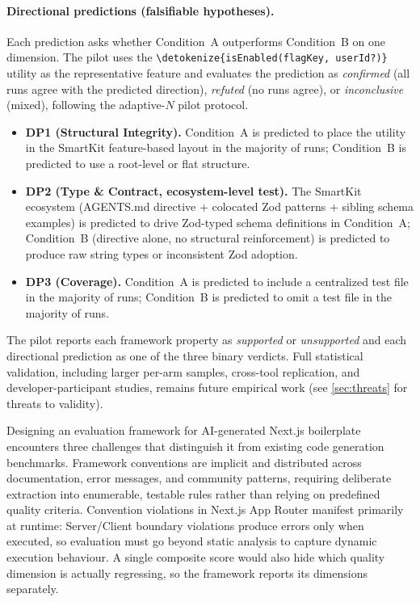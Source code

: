 \documentclass[12pt,a4paper]{report}
\newcommand{\code}[1]{\texttt{\nolinkurl{\detokenize{#1}}}}
\begin{document}
\paragraph{Directional predictions (falsifiable hypotheses).} Each
prediction asks whether Condition~A outperforms Condition~B on one
dimension. The pilot uses the \code{isEnabled(flagKey, userId?)}
utility as the representative feature and evaluates the prediction as
\emph{confirmed} (all runs agree with the predicted direction),
\emph{refuted} (no runs agree), or \emph{inconclusive} (mixed),
following the adaptive-$N$ pilot protocol.

\begin{itemize}
    \item \textbf{DP1 (Structural Integrity).} Condition~A is predicted to place the
    utility in the SmartKit feature-based layout in the majority of runs;
    Condition~B is predicted to use a root-level or flat structure.
    \item \textbf{DP2 (Type \& Contract, ecosystem-level test).} The SmartKit ecosystem (AGENTS.md directive + colocated Zod patterns + sibling schema examples) is predicted to drive Zod-typed schema definitions in Condition~A; Condition~B (directive alone, no structural reinforcement) is predicted to produce raw string types or inconsistent Zod adoption.
    \item \textbf{DP3 (Coverage).} Condition~A is predicted to include a
    centralized test file in the majority of runs;
    Condition~B is predicted to omit a test file in the majority of runs.
\end{itemize}

The pilot reports each framework property as \emph{supported} or
\emph{unsupported} and each directional prediction as one of the three
binary verdicts. Full statistical validation, including larger
per-arm samples, cross-tool replication, and developer-participant
studies, remains future empirical work (see \autoref{sec:threats}
for threats to validity).

Designing an evaluation framework for AI-generated Next.js boilerplate encounters three challenges that distinguish it from existing code generation benchmarks. Framework conventions are implicit and distributed across documentation, error messages, and community patterns, requiring deliberate extraction into enumerable, testable rules rather than relying on predefined quality criteria. Convention violations in Next.js App Router manifest primarily at runtime: Server/Client boundary violations produce errors only when executed, so evaluation must go beyond static analysis to capture dynamic execution behaviour. A single composite score would also hide which quality dimension is actually regressing, so the framework reports its dimensions separately.
\end{document}
